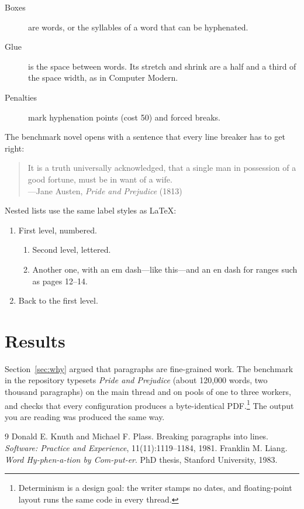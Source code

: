 \documentclass[10pt]{article}
\begin{document}
\begin{description}
  \item[Boxes] are words, or the syllables of a word that can be hyphenated.
  \item[Glue] is the space between words. Its stretch and shrink are a half
        and a third of the space width, as in Computer Modern.
  \item[Penalties] mark hyphenation points (cost 50) and forced breaks.
\end{description}

The benchmark novel opens with a sentence that every line breaker has to get
right:
\begin{quote}
It is a truth universally acknowledged, that a single man in possession of a
good fortune, must be in want of a wife.\\
\hspace*{\fill}---Jane Austen, \emph{Pride and Prejudice} (1813)
\end{quote}

Nested lists use the same label styles as \LaTeX:
\begin{enumerate}
  \item First level, numbered.
  \begin{enumerate}
    \item Second level, lettered.
    \item Another one, with an em dash---like this---and an en dash for
          ranges such as pages 12--14.
  \end{enumerate}
  \item Back to the first level.
\end{enumerate}

\section{Results}

Section~\ref{sec:why} argued that paragraphs are fine-grained work. The
benchmark in the repository typesets \emph{Pride and Prejudice} (about 120{,}000
words, two thousand paragraphs) on the main thread and on pools of one to three
workers, and checks that every configuration produces a byte-identical
PDF.\footnote{Determinism is a design goal: the writer stamps no dates, and
floating-point layout runs the same code in every thread.} The output you are
reading was produced the same way.

\begin{thebibliography}{9}
 Donald E. Knuth and Michael F. Plass. Breaking paragraphs into
  lines. \emph{Software: Practice and Experience}, 11(11):1119--1184, 1981.
 Franklin M. Liang. \emph{Word Hy-phen-a-tion by Com-put-er}.
  PhD thesis, Stanford University, 1983.
\end{thebibliography}
\end{document}
